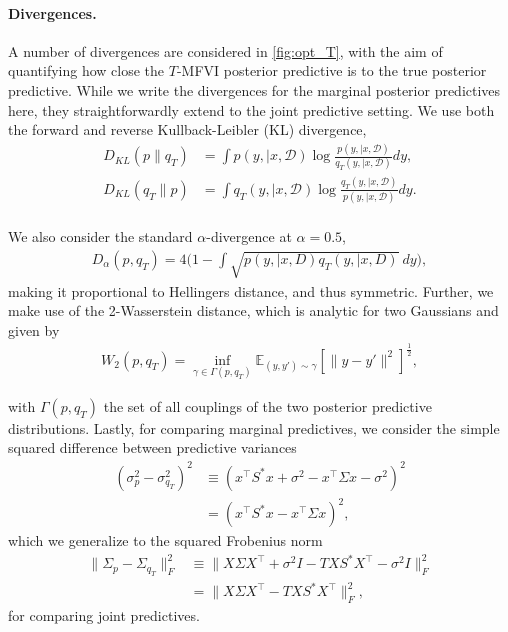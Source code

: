 \documentclass{article}
\theoremstyle{plain}
\theoremstyle{definition}
\theoremstyle{remark}
\theoremstyle{plain}
\begin{document}
\paragraph{Divergences.} A number of divergences are considered in \cref{fig:opt_T}, with the aim of quantifying how close the $T$-MFVI posterior predictive is to the true posterior predictive. While we write the divergences for the marginal posterior predictives here, they straightforwardly extend to the joint predictive setting. We use both the forward and reverse Kullback-Leibler (KL) divergence,
\begin{align}
    D_{KL}(p \|q_T) &= \int p(y, \mid x, \mathcal{D}) \log \frac{p(y, \mid x, \mathcal{D})}{q_T(y, \mid x, \mathcal{D})}dy, \\
    D_{KL}(q_T \|p) &= \int q_T(y, \mid x, \mathcal{D}) \log \frac{q_T(y, \mid x, \mathcal{D})}{p(y, \mid x, \mathcal{D})}dy. \\
\end{align}

We also consider the standard $\alpha$-divergence at $\alpha=0.5$,
\begin{align}
    D_\alpha(p, q_T) =  4 \Bigg(1- \int\sqrt{p(y, \mid x, D)q_T(y, \mid x, D)} \ dy\Bigg),
\end{align}
making it proportional to Hellingers distance, and thus symmetric. Further, we make use of the 2-Wasserstein distance, which is analytic for two Gaussians and given by
\begin{align}
    W_2(p, q_T) = \inf_{\gamma \in \Gamma(p, q_T)}  \mathbb{E}_{(y, y') \sim \gamma}[\|y - y' \|^2]^{\frac{1}{2}},
\end{align}

with $\Gamma(p, q_T)$ the set of all couplings of the two posterior predictive distributions. 
Lastly, for comparing marginal predictives, we consider the simple squared difference between predictive variances
\begin{align}
    (\sigma_p^2 - \sigma_{q_T}^2)^2 &\equiv (x^\top S^* x + \sigma^2 -x^\top  \Sigma x - \sigma^2)^2 \\
    & =  (x^\top S^* x  -x^\top \Sigma x)^2,
\end{align}
which we generalize to the squared Frobenius norm
\begin{align}
    \|\Sigma_p - \Sigma_{q_T}\|_F^2 & \equiv \| X\Sigma X^\top + \sigma^2 I - TXS^*X^\top - \sigma^2 I\|_F^2 \\
    &= \| X\Sigma X^\top - TXS^*X^\top \|_F^2, 
\end{align}
for comparing joint predictives.
\end{document}
